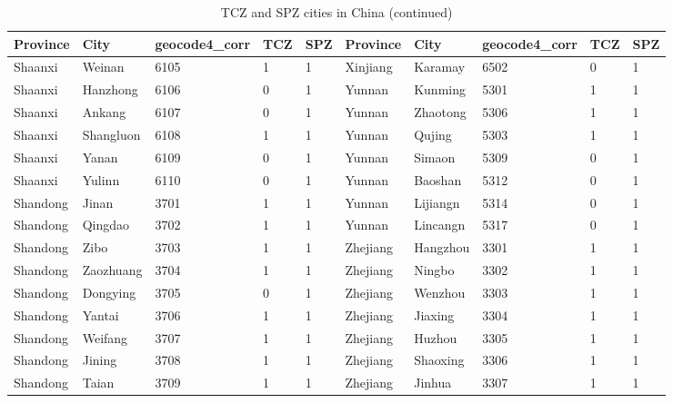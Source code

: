 \documentclass[12pt]{article}
\begin{document}
\begin{table}[!htbp] \centering
  \caption{TCZ and SPZ cities in China (continued)}
  \begin{adjustbox}{width=\textwidth, totalheight=\baselineskip,keepaspectratio}
    \label{tab:appendix3}
\begin{tabular}{llllllllll}
\hline
Province       & City         & geocode4\_corr & TCZ & SPZ & Province & City        & geocode4\_corr & TCZ & SPZ \\
\hline
Shaanxi  & Weinan    & 6105           & 1   & 1   & Xinjiang & Karamay  & 6502           & 0   & 1   \\
Shaanxi  & Hanzhong  & 6106           & 0   & 1   & Yunnan   & Kunming  & 5301           & 1   & 1   \\
Shaanxi  & Ankang    & 6107           & 0   & 1   & Yunnan   & Zhaotong & 5306           & 1   & 1   \\
Shaanxi  & Shangluon & 6108           & 1   & 1   & Yunnan   & Qujing   & 5303           & 1   & 1   \\
Shaanxi  & Yanan     & 6109           & 0   & 1   & Yunnan   & Simaon   & 5309           & 0   & 1   \\
Shaanxi  & Yulinn    & 6110           & 0   & 1   & Yunnan   & Baoshan  & 5312           & 0   & 1   \\
Shandong & Jinan     & 3701           & 1   & 1   & Yunnan   & Lijiangn & 5314           & 0   & 1   \\
Shandong & Qingdao   & 3702           & 1   & 1   & Yunnan   & Lincangn & 5317           & 0   & 1   \\
Shandong & Zibo      & 3703           & 1   & 1   & Zhejiang & Hangzhou & 3301           & 1   & 1   \\
Shandong & Zaozhuang & 3704           & 1   & 1   & Zhejiang & Ningbo   & 3302           & 1   & 1   \\
Shandong & Dongying  & 3705           & 0   & 1   & Zhejiang & Wenzhou  & 3303           & 1   & 1   \\
Shandong & Yantai    & 3706           & 1   & 1   & Zhejiang & Jiaxing  & 3304           & 1   & 1   \\
Shandong & Weifang   & 3707           & 1   & 1   & Zhejiang & Huzhou   & 3305           & 1   & 1   \\
Shandong & Jining    & 3708           & 1   & 1   & Zhejiang & Shaoxing & 3306           & 1   & 1   \\
Shandong & Taian     & 3709           & 1   & 1   & Zhejiang & Jinhua   & 3307           & 1   & 1   \\

\end{tabular}
\end{adjustbox}
\end{table}
\end{document}
